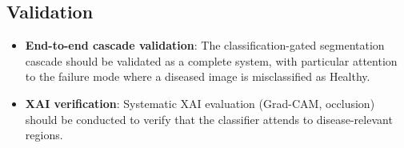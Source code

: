 \subsection{Validation}
\label{sec:rec-validation}

\begin{itemize}
    \item \textbf{End-to-end cascade validation}: The classification-gated segmentation cascade should be validated as a complete system, with particular attention to the failure mode where a diseased image is misclassified as Healthy.
    \item \textbf{XAI verification}: Systematic XAI evaluation (Grad-CAM, occlusion) should be conducted to verify that the classifier attends to disease-relevant regions.
\end{itemize}